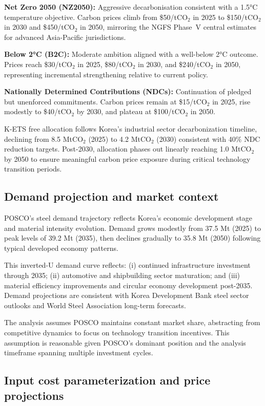 \documentclass[preprint,1p,authoryear]{elsarticle}
\begin{document}
\textbf{Net Zero 2050 (NZ2050):} Aggressive decarbonisation consistent with a 1.5°C temperature objective. Carbon prices climb from \$50/tCO$_2$ in 2025 to \$150/tCO$_2$ in 2030 and \$450/tCO$_2$ in 2050, mirroring the NGFS Phase~V central estimates for advanced Asia-Pacific jurisdictions.

\textbf{Below 2°C (B2C):} Moderate ambition aligned with a well-below 2°C outcome. Prices reach \$30/tCO$_2$ in 2025, \$80/tCO$_2$ in 2030, and \$240/tCO$_2$ in 2050, representing incremental strengthening relative to current policy.

\textbf{Nationally Determined Contributions (NDCs):} Continuation of pledged but unenforced commitments. Carbon prices remain at \$15/tCO$_2$ in 2025, rise modestly to \$40/tCO$_2$ by 2030, and plateau at \$100/tCO$_2$ in 2050.

K-ETS free allocation follows Korea's industrial sector decarbonization timeline, declining from 8.5 MtCO$_2$ (2025) to 4.2 MtCO$_2$ (2030) consistent with 40\% NDC reduction targets. Post-2030, allocation phases out linearly reaching 1.0 MtCO$_2$ by 2050 to ensure meaningful carbon price exposure during critical technology transition periods.

\subsection{Demand projection and market context}

POSCO's steel demand trajectory reflects Korea's economic development stage and material intensity evolution. Demand grows modestly from 37.5 Mt (2025) to peak levels of 39.2 Mt (2035), then declines gradually to 35.8 Mt (2050) following typical developed economy patterns.

This inverted-U demand curve reflects: (i) continued infrastructure investment through 2035; (ii) automotive and shipbuilding sector maturation; and (iii) material efficiency improvements and circular economy development post-2035. Demand projections are consistent with Korea Development Bank steel sector outlooks and World Steel Association long-term forecasts.

The analysis assumes POSCO maintains constant market share, abstracting from competitive dynamics to focus on technology transition incentives. This assumption is reasonable given POSCO's dominant position and the analysis timeframe spanning multiple investment cycles.

\subsection{Input cost parameterization and price projections}
\end{document}
